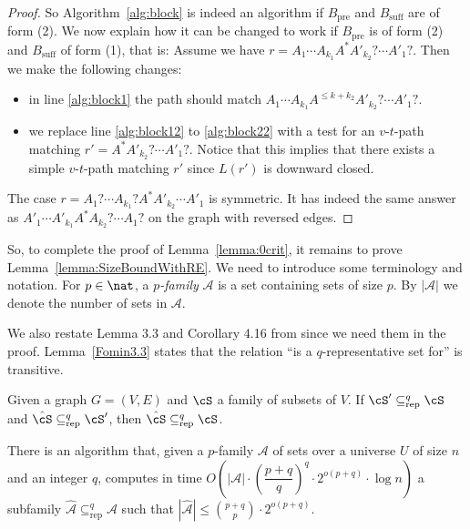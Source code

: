 \documentclass[a4paper,english]{lipics-v2016}
\theoremstyle{plain}
\begin{document}
\begin{proof}
So Algorithm~\ref{alg:block} is indeed an \fpt algorithm if $B_\text{pre}$ and $B_\text{suff}$ are of form (2). We now explain how it can be changed to work if $B_\text{pre}$ is of form (2) and $B_\text{suff}$ of form (1), that is: Assume we have $r = A_1 \cdots A_{k_1} A^* A'_{k_2}?\cdots A'_1?$. Then we make the following changes:
\begin{itemize}
\item in line \ref{alg:block1} the path should match $A_1 \cdots A_{k_1} A^{\leq k+k_2} A'_{k_2}?\cdots A'_1?$.
\item we replace line \ref{alg:block12} to \ref{alg:block22} with a test for an $v$-$t$-path matching $r'=A^* A'_{k_2}?\cdots A'_1?$. Notice that this implies that there exists a simple $v$-$t$-path matching $r'$ since $L(r')$ is downward closed.
\end{itemize}
The case $r= A_1? \cdots A_{k_1}? A^* A'_{k_2}\cdots A'_1$ is symmetric. It has indeed the same answer as $A'_1 \cdots A'_{k_1} A^* A_{k_2}?\cdots A_1?$ on the graph with reversed edges. 
\end{proof}




So, to complete the proof of Lemma~\ref{lemma:0crit}, it remains to
prove Lemma~\ref{lemma:SizeBoundWithRE}. We need to introduce some
terminology and notation. 
For $p \in \nat$, a \emph{$p$-family} $\mathcal{A}$ is a set containing
sets of size $p$. By $|\mathcal{A}|$ we denote the number of sets in $\mathcal{A}$.

We also restate Lemma 3.3
and Corollary 4.16 from \cite{fomin} since we need them in the
proof. Lemma~\ref{Fomin3.3} states that the relation ``is a $q$-representative
set for'' is transitive.
\begin{lemma}\label{Fomin3.3}
Given a graph $G=(V,E)$ and $\cS$ a family of subsets of $V$. If $\cS'\subseteq^q_\text{rep} \cS$ and $\hat{\cS}\subseteq^q_\text{rep} \cS'$, then $\hat{\cS}\subseteq^q_\text{rep} \cS$.
\end{lemma}

\begin{corollary}
\label{Fomin4.16}
There is an algorithm that, given a $p$-family $\mathcal{A}$ of sets
over a universe $U$ of size $n$ and an integer $q$, computes in time $O\left(|\mathcal{A}| \cdot \left(\dfrac{p+q}{q} \right)^q \cdot 2^{o(p+q)} \cdot \log n \right)$ a subfamily $\hat{\mathcal{A}} \subseteq^q_\text{rep} \mathcal{A}$ such that $|\hat{\mathcal{A}}|\leq  \binom{p+q}{p} \cdot 2^{o(p+q)}$. 
\end{corollary}
\end{document}
